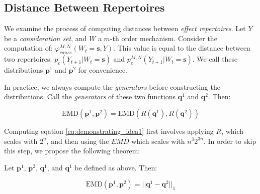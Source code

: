 \subsection{Distance Between Repertoires}
\label{sec:speedup}
We examine the process of computing distances between \textit{effect repertoires}. Let $Y$ be a \textit{consideration set}, and $W$ a $m$-th order mechanism. Consider the computation of: $\varphi^{M,N}_{cause}(W_t = \mathbf{s}, Y)$. This value is equal to the distance between two repertoires: $p_e(Y_{t+1}|W_t = \mathbf{s})$ and $p_e^{M,N}(Y_{t+1}|W_t = \mathbf{s})$. We call these distributions $\mathbf{p}^1$ and $\mathbf{p}^2$ for convenience.

In practice, we always compute the \textit{generators} before constructing the distributions. Call the \textit{generators} of these two functions $\mathbf{q}^1$ and $\mathbf{q}^2$. Then:

\begin{equation}
\label{eq:demonstrating_idea1}
\text{EMD}(\mathbf{p}^1, \mathbf{p}^2) =\text{EMD}(R(\mathbf{q}^1), R(\mathbf{q}^2))
\end{equation}

Computing eqation \ref{eq:demonstrating_idea1} first involves applying $R$, which scales with $2^n$, and then using the $EMD$ which scales with $n^3 2^{3n}$. In order to skip this step, we propose the following theorem:

\begin{theorem}
	\label{thm:speedup}
	Let $\mathbf{p}^1$, $\mathbf{p}^2$, $\mathbf{q}^1$, and $\mathbf{q}^1$ be defined as above. Then:
	
	\begin{equation}
	\label{eq:theorem_statement}
	\text{EMD}(\mathbf{p}^1, \mathbf{p}^2)= ||\mathbf{q}^1 - \mathbf{q}^2||_1
	\end{equation}
\end{theorem}

